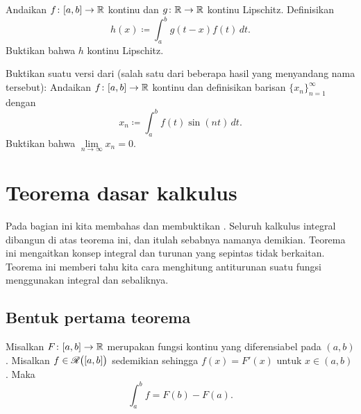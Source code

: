 \begin{exercise}
Andaikan $f \colon [a,b] \to {\mathbb{R}}$ kontinu dan $g \colon {\mathbb{R}} \to {\mathbb{R}}$
kontinu Lipschitz.  Definisikan
\begin{equation*}
h(x) \coloneqq \int_a^b g(t-x) f(t) \, dt .
\end{equation*}
Buktikan bahwa $h$ kontinu Lipschitz.
\end{exercise}

\begin{exercise} \label{exercise:rieleblem}
Buktikan suatu versi dari \emph{}
(salah satu dari beberapa hasil yang menyandang nama tersebut):
Andaikan $f \colon [a,b] \to {\mathbb{R}}$ kontinu dan definisikan barisan
$\{ x_n \}_{n=1}^\infty$ dengan
\begin{equation*}
x_n \coloneqq \int_a^b f(t) \sin(nt) \, dt .
\end{equation*}
Buktikan bahwa $\lim\limits_{n\to\infty} x_n = 0$.
\end{exercise}


\sectionnewpage
\section{Teorema dasar kalkulus}
\label{sec:ftc}



Pada bagian ini kita membahas dan membuktikan
\emph{}.
Seluruh kalkulus integral dibangun di atas teorema ini,
dan itulah sebabnya namanya demikian.
Teorema ini mengaitkan konsep integral dan turunan yang sepintas tidak berkaitan.
Teorema ini memberi tahu kita cara menghitung antiturunan suatu fungsi
menggunakan integral dan sebaliknya.

\subsection{Bentuk pertama teorema}

\begin{thm} \label{thm:FTCv1}
Misalkan $F \colon [a,b] \to {\mathbb{R}}$ merupakan fungsi kontinu yang diferensiabel
pada $(a,b)$.  Misalkan $f \in {\mathscr{R}}\bigl([a,b]\bigr)$ sedemikian sehingga $f(x) = F'(x)$ untuk $x \in
(a,b)$.  Maka
\begin{equation*}
\int_a^b f = F(b)-F(a) .
\end{equation*}
\end{thm}

